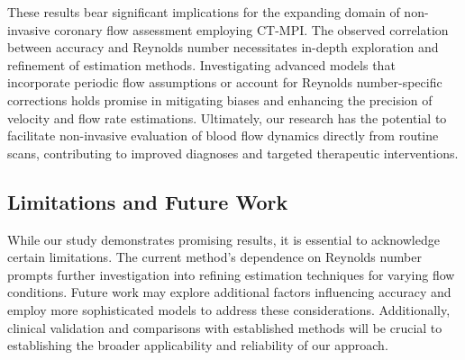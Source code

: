 \documentclass[times,twocolumn,final]{elsarticle}
\begin{document}
These results bear significant implications for the expanding domain of non-invasive coronary flow assessment employing CT-MPI. The observed correlation between accuracy and Reynolds number necessitates in-depth exploration and refinement of estimation methods. Investigating advanced models that incorporate periodic flow assumptions or account for Reynolds number-specific corrections holds promise in mitigating biases and enhancing the precision of velocity and flow rate estimations. Ultimately, our research has the potential to facilitate non-invasive evaluation of blood flow dynamics directly from routine scans, contributing to improved diagnoses and targeted therapeutic interventions.

\subsection{Limitations and Future Work}

While our study demonstrates promising results, it is essential to acknowledge certain limitations. The current method's dependence on Reynolds number prompts further investigation into refining estimation techniques for varying flow conditions. Future work may explore additional factors influencing accuracy and employ more sophisticated models to address these considerations. Additionally, clinical validation and comparisons with established methods will be crucial to establishing the broader applicability and reliability of our approach.

\end{document}
